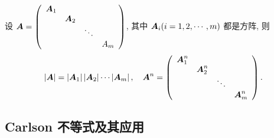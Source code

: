 \begin{theorem}[分块矩阵的行列式]
    设 $ \vb*{A}=\left(\begin{array}{llll}\vb*{A}_{1} & & & \\ & \vb*{A}_{2} & & \\ & & \ddots & \\ & & & A_{m}\end{array}\right) $, 其中 $ \vb*{A}_{i}(i=1,2, \cdots, m) $ 都是方阵, 则
          $$|\vb*{A}|=\left|\vb*{A}_{1}\right|\left|\vb*{A}_{2}\right| \cdots\left|\vb*{A}_{m}\right|, \quad \vb*{A}^{n}=\left(\begin{array}{llll}
                      \vb*{A}_{1}^{n} &                 &        &                 \\
                                      & \vb*{A}_{2}^{n} &        &                 \\
                                      &                 & \ddots &                 \\
                                      &                 &        & \vb*{A}_{m}^{n}
                  \end{array}\right) .$$
\end{theorem}

\subsection{Carlson 不等式及其应用}

